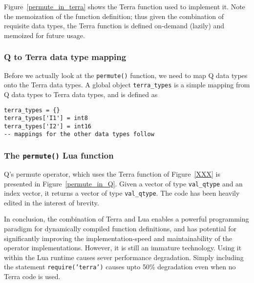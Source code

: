 \begin{figure}
\centering
{}
\end{figure}

Figure~\ref{permute_in_terra} shows the Terra function used to implement it.
Note the memoization of the function definition; thus given the combination of requisite data types, the Terra function is defined on-demand (lazily) and memoized for future usage.

\subsubsection{Q to Terra data type mapping}
Before we actually look at the {\tt permute()} function, we need to map Q data types onto the Terra data types. A global object {\tt terra\_types} is a simple mapping from Q data types to Terra data types, and is defined as
\begin{verbatim}
terra_types = {} 
terra_types['I1'] = int8
terra_types['I2'] = int16
-- mappings for the other data types follow
\end{verbatim}

\subsubsection{The {\tt permute()} Lua function}
Q's permute operator, which uses the Terra function of Figure~\ref{XXX} 
is presented in Figure~\ref{permute_in_Q}. 
Given a vector of type {\tt val\_qtype} and an index vector, it 
returns a vector of type {\tt val\_qtype}.
The code has been heavily edited in the interest of brevity.

\begin{figure}
\centering
{}
\end{figure}

In conclusion,
the combination of Terra and Lua enables a powerful programming paradigm for dynamically compiled function definitions, and has potential for significantly improving the implementation-speed and maintainability of the operator implementations. 
However, it is
still an immature technology. Using it within the Lua runtime causes sever
performance degradation. Simply including the statement 
{\tt require('terra')} causes upto 50\% degradation even when no Terra code is
used. 

